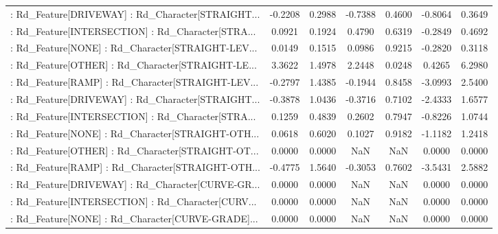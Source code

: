 \begin{longtable}{p{4cm}cccccc}
 : Rd\_Feature[DRIVEWAY] : Rd\_Character[STRAIGHT... &           -0.2208 &            0.2988 & -0.7388 &       0.4600 &            -0.8064 &            0.3649 \\
 : Rd\_Feature[INTERSECTION] : Rd\_Character[STRA... &            0.0921 &            0.1924 &  0.4790 &       0.6319 &            -0.2849 &            0.4692 \\
 : Rd\_Feature[NONE] : Rd\_Character[STRAIGHT-LEV... &            0.0149 &            0.1515 &  0.0986 &       0.9215 &            -0.2820 &            0.3118 \\
 : Rd\_Feature[OTHER] : Rd\_Character[STRAIGHT-LE... &            3.3622 &            1.4978 &  2.2448 &       0.0248 &             0.4265 &            6.2980 \\
 : Rd\_Feature[RAMP] : Rd\_Character[STRAIGHT-LEV... &           -0.2797 &            1.4385 & -0.1944 &       0.8458 &            -3.0993 &            2.5400 \\
 : Rd\_Feature[DRIVEWAY] : Rd\_Character[STRAIGHT... &           -0.3878 &            1.0436 & -0.3716 &       0.7102 &            -2.4333 &            1.6577 \\
 : Rd\_Feature[INTERSECTION] : Rd\_Character[STRA... &            0.1259 &            0.4839 &  0.2602 &       0.7947 &            -0.8226 &            1.0744 \\
 : Rd\_Feature[NONE] : Rd\_Character[STRAIGHT-OTH... &            0.0618 &            0.6020 &  0.1027 &       0.9182 &            -1.1182 &            1.2418 \\
 : Rd\_Feature[OTHER] : Rd\_Character[STRAIGHT-OT... &            0.0000 &            0.0000 &     NaN &          NaN &             0.0000 &            0.0000 \\
 : Rd\_Feature[RAMP] : Rd\_Character[STRAIGHT-OTH... &           -0.4775 &            1.5640 & -0.3053 &       0.7602 &            -3.5431 &            2.5882 \\
 : Rd\_Feature[DRIVEWAY] : Rd\_Character[CURVE-GR... &            0.0000 &            0.0000 &     NaN &          NaN &             0.0000 &            0.0000 \\
 : Rd\_Feature[INTERSECTION] : Rd\_Character[CURV... &            0.0000 &            0.0000 &     NaN &          NaN &             0.0000 &            0.0000 \\
 : Rd\_Feature[NONE] : Rd\_Character[CURVE-GRADE]... &            0.0000 &            0.0000 &     NaN &          NaN &             0.0000 &            0.0000 \\

\end{longtable}
